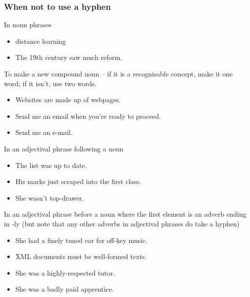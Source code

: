 \documentclass[11pt,a4paper]{book}
\newcommand{\xmark}{{\color{cadmiumred}\ding{54}}}%
\newcommand{\cmark}{{\color{green(html/cssgreen)}\checkmark}}%
\begin{document}
		\subsubsection{When not to use a hyphen}
		In noun phrases
		{\firasans \begin{mdframed}[backgroundcolor=aliceblue] \begin{itemize}[label=\cmark]
			\item distance learning
			\item The 19th century saw much reform.
		\end{itemize} \end{mdframed} }
		To make a new compound noun -- if it is a recognisable concept, make it one word; if it isn't, use two words.
		{\firasans \begin{mdframed}[backgroundcolor=aliceblue] \begin{itemize}[label=\cmark]
			\item Websites are made up of webpages.
			\item Send me an email when you're ready to proceed.
			\item[\xmark] Send me an e-mail.
		\end{itemize} \end{mdframed} }
		In an adjectival phrase following a noun
		{\firasans \begin{mdframed}[backgroundcolor=aliceblue] \begin{itemize}[label=\cmark]
			\item The list was up to date.
			\item His marks just scraped into the first class.
			\item She wasn't top-drawer.
		\end{itemize} \end{mdframed} }
		In an adjectival phrase before a noun where the first element is an adverb ending in \mbox{‑ly} (but note that any other adverbs in adjectival phrases do take a hyphen)
		{\firasans \begin{mdframed}[backgroundcolor=aliceblue] \begin{itemize}[label=\cmark]
			\item She had a finely tuned ear for off-key music.
			\item XML documents must be well-formed texts.
			\item[\xmark] She was a highly-respected tutor.
			\item She was a badly paid apprentice.
		\end{itemize} \end{mdframed} }
\end{document}

